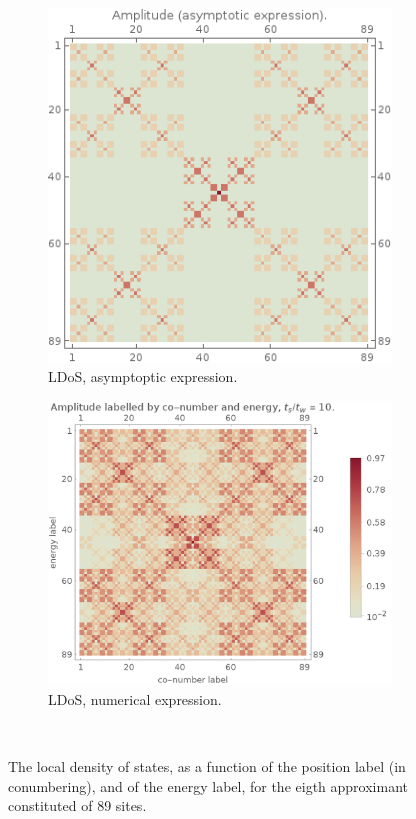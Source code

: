 \documentclass[11pt]{article}
\begin{document}
\begin{figure}[htp]
\centering
\begin{subfigure}{.5\textwidth}
  \centering
  \includegraphics[width=.75\textwidth]{img/amplitude_asym.png}
  \caption{LDoS, asymptoptic expression.}
  \label{fig:wf_idos_asym}
\end{subfigure}%
\begin{subfigure}{.5\textwidth}
  \centering
  \includegraphics[width=1.\textwidth]{img/wf_idos.png}
  \caption{LDoS, numerical expression.}
  \label{fig:wf_idos_num}
\end{subfigure} \\
\caption{The local density of states, as a function of the position label (in conumbering), and of the energy label, for the eigth approximant constituted of 89 sites.}
\label{fig:wf_idos}
\end{figure}
\end{document}
